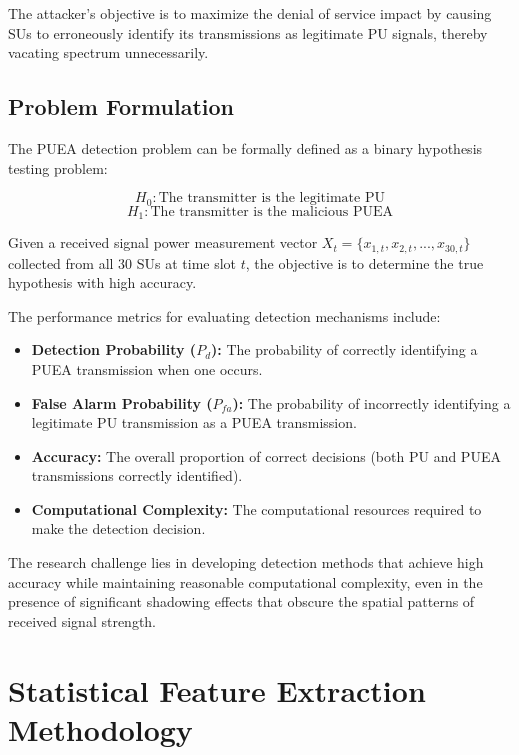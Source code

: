 The attacker's objective is to maximize the denial of service impact by causing SUs to erroneously identify its transmissions as legitimate PU signals, thereby vacating spectrum unnecessarily.

\section{Problem Formulation}

The PUEA detection problem can be formally defined as a binary hypothesis testing problem:

\begin{equation}
    H_0: \text{The transmitter is the legitimate PU}
\end{equation}
\begin{equation}
    H_1: \text{The transmitter is the malicious PUEA}
\end{equation}

Given a received signal power measurement vector $X_t = \{x_{1,t}, x_{2,t}, ..., x_{30,t}\}$ collected from all 30 SUs at time slot $t$, the objective is to determine the true hypothesis with high accuracy.

The performance metrics for evaluating detection mechanisms include:

\begin{itemize}
    \item \textbf{Detection Probability ($P_d$):} The probability of correctly identifying a PUEA transmission when one occurs.
    \item \textbf{False Alarm Probability ($P_{fa}$):} The probability of incorrectly identifying a legitimate PU transmission as a PUEA transmission.
    \item \textbf{Accuracy:} The overall proportion of correct decisions (both PU and PUEA transmissions correctly identified).
    \item \textbf{Computational Complexity:} The computational resources required to make the detection decision.
\end{itemize}

The research challenge lies in developing detection methods that achieve high accuracy while maintaining reasonable computational complexity, even in the presence of significant shadowing effects that obscure the spatial patterns of received signal strength.

\chapter{Statistical Feature Extraction Methodology}

